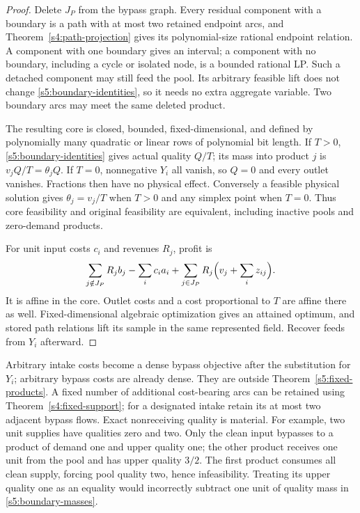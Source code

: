 \begin{proof}
Delete $J_P$ from the bypass graph. Every residual component with a
boundary is a path with at most two retained endpoint arcs, and
Theorem~\ref{s4:path-projection} gives its polynomial-size rational
endpoint relation. A component with one boundary gives an interval;
a component with no boundary, including a cycle or isolated node, is
a bounded rational LP. Such a detached component may still feed the
pool. Its arbitrary feasible lift does not change
\eqref{s5:boundary-identities}, so it needs no extra aggregate variable.
Two boundary arcs may meet the same deleted product.

The resulting core is closed, bounded, fixed-dimensional, and defined
by polynomially many quadratic or linear rows of polynomial bit length.
If $T>0$, \eqref{s5:boundary-identities} gives actual quality $Q/T$;
its mass into product $j$ is $v_jQ/T=\theta_jQ$. If $T=0$, nonnegative
$Y_i$ all vanish, so $Q=0$ and every outlet vanishes. Fractions then
have no physical effect. Conversely a feasible physical solution gives
$\theta_j=v_j/T$ when $T>0$ and any simplex point when $T=0$.
Thus core feasibility and original feasibility are equivalent, including
inactive pools and zero-demand products.

For unit input costs $c_i$ and revenues $R_j$, profit is
\[
 \sum_{j\notin J_P}R_jb_j-\sum_ic_i a_i
       +\sum_{j\in J_P}R_j\Bigl(v_j+\sum_i z_{ij}\Bigr).
\]
It is affine in the core. Outlet costs and a cost proportional to $T$
are affine there as well. Fixed-dimensional algebraic optimization gives
an attained optimum, and stored path relations lift its sample in the
same represented field. Recover feeds from $Y_i$ afterward.
\end{proof}

Arbitrary intake costs become a dense bypass objective after the
substitution for $Y_i$; arbitrary bypass costs are already dense. They
are outside Theorem~\ref{s5:fixed-products}. A fixed number of additional
cost-bearing arcs can be retained using Theorem~\ref{s4:fixed-support};
for a designated intake retain its at most two adjacent bypass flows.
Exact nonreceiving quality is material. For example, two unit supplies
have qualities zero and two. Only the clean input bypasses to a product
of demand one and upper quality one; the other product receives one unit
from the pool and has upper quality $3/2$. The first product consumes
all clean supply, forcing pool quality two, hence infeasibility. Treating
its upper quality one as an equality would incorrectly subtract one
unit of quality mass in \eqref{s5:boundary-masses}.

